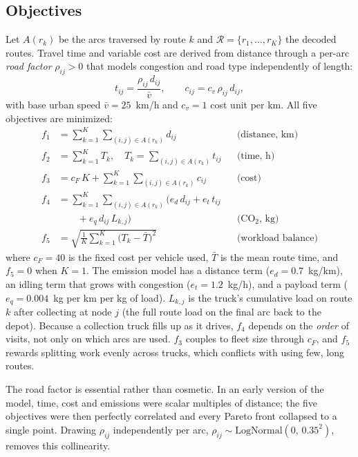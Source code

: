 \subsection{Objectives}
Let $A(r_k)$ be the arcs traversed by route $k$ and $\mathcal{R}=\{r_1,\dots,r_K\}$
the decoded routes. Travel time and variable cost are derived from distance
through a per-arc \emph{road factor} $\rho_{ij}>0$ that models congestion and
road type independently of length:
\begin{equation}
t_{ij}=\frac{\rho_{ij}\,d_{ij}}{\bar v},\qquad c_{ij}=c_v\,\rho_{ij}\,d_{ij},
\end{equation}
with base urban speed $\bar v=25$~km/h and $c_v=1$ cost unit per km. All five
objectives are minimized:
\begin{align}
f_1 &= \sum_{k=1}^{K}\sum_{(i,j)\in A(r_k)} d_{ij}
  && \text{(distance, km)}\\
f_2 &= \sum_{k=1}^{K} T_k,\quad T_k=\sum_{(i,j)\in A(r_k)} t_{ij}
  && \text{(time, h)}\\
f_3 &= c_F\,K+\sum_{k=1}^{K}\sum_{(i,j)\in A(r_k)} c_{ij}
  && \text{(cost)}\\
f_4 &= \sum_{k=1}^{K}\sum_{(i,j)\in A(r_k)}
  \bigl(e_d\,d_{ij}+e_t\,t_{ij}\nonumber\\
  &\qquad+e_q\,d_{ij}\,L_{k,j}\bigr)
  && \text{(CO$_2$, kg)}\\
f_5 &= \sqrt{\tfrac{1}{K}\textstyle\sum_{k=1}^{K}\bigl(T_k-\bar T\bigr)^2}
  && \text{(workload balance)}
\end{align}
where $c_F=40$ is the fixed cost per vehicle used, $\bar T$ is the mean route
time, and $f_5=0$ when $K=1$. The emission model has a distance term
($e_d=0.7$~kg/km), an idling term that grows with congestion
($e_t=1.2$~kg/h), and a payload term ($e_q=0.004$~kg per km per kg of load).
$L_{k,j}$ is the truck's cumulative load on route $k$ after collecting at
node $j$ (the full route load on the final arc back to the depot). Because a
collection truck fills up as it drives, $f_4$ depends on the \emph{order} of
visits, not only on which arcs are used. $f_3$ couples to fleet size through
$c_F$, and $f_5$ rewards splitting work evenly across trucks, which conflicts
with using few, long routes.

The road factor is essential rather than cosmetic. In an early version of the
model, time, cost and emissions were scalar multiples of distance; the five
objectives were then perfectly correlated and every Pareto front collapsed to a
single point. Drawing $\rho_{ij}$ independently per arc,
$\rho_{ij}\sim\mathrm{LogNormal}(0,\,0.35^2)$, removes this collinearity.

